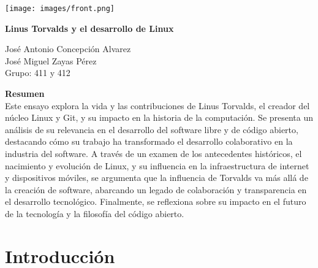 \documentclass[a4paper,12pt]{article}
\begin{document}

\begin{titlepage}
    \centering
    
    \texttt{[image: images/front.png]} %
    
    \vspace{1cm}
    \newpage
    
    {\Huge \textbf{Linus Torvalds y el desarrollo de Linux}}\\
    \vspace{0.5cm}
    
    {\Large José Antonio Concepción Alvarez \\  José Miguel Zayas Pérez \\ Grupo: 411 y 412}
    
    
   \thispagestyle{empty} 
\end{titlepage}

\begin{centering}
    \vspace{2cm}
    \textbf{Resumen}\\
    Este ensayo explora la vida y las contribuciones de Linus Torvalds, el
    creador del núcleo Linux y Git, y su impacto en la historia de la
    computación. Se presenta un análisis de su relevancia en el desarrollo del
    software libre y de código abierto, destacando cómo su trabajo ha
    transformado el desarrollo colaborativo en la industria del software. A
    través de un examen de los antecedentes históricos, el nacimiento y
    evolución de Linux, y su influencia en la infraestructura de internet y
    dispositivos móviles, se argumenta que la influencia de Torvalds va más allá
    de la creación de software, abarcando un legado de colaboración y
    transparencia en el desarrollo tecnológico. Finalmente, se reflexiona sobre
    su impacto en el futuro de la tecnología y la filosofía del código abierto.
\end{centering}
\newpage

\tableofcontents
\newpage

\section{Introducción} 
\end{document}
